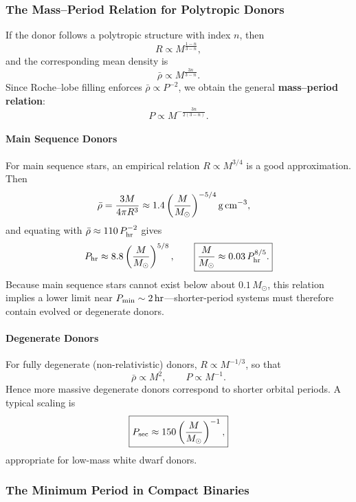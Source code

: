 \subsubsection{The Mass–Period Relation for Polytropic Donors}

If the donor follows a polytropic structure with index $n$, then
\begin{equation}
R \propto M^{\frac{1-n}{3-n}},
\end{equation}
and the corresponding mean density is
\begin{equation}
\bar{\rho} \propto M^{\tfrac{3n}{3-n}}.
\end{equation}
Since Roche–lobe filling enforces $\bar{\rho} \propto P^{-2}$, we obtain the general
\textbf{mass–period relation}:
\[
\boxed{
P \propto M^{-\tfrac{3n}{2(3-n)}}.
}
\]

\paragraph{Main Sequence Donors}
For main sequence stars, an empirical relation $R \propto M^{3/4}$ is a good approximation.  
Then
\begin{align}
\bar{\rho}
   &= \frac{3M}{4\pi R^3}
   \approx 1.4
   \left(\frac{M}{M_\odot}\right)^{-5/4}
   {\rm g\,cm^{-3}},
\end{align}
and equating with $\bar{\rho} \approx 110\,P_{\rm hr}^{-2}$ gives
\[
P_{\rm hr} \approx 8.8
\left(\frac{M}{M_\odot}\right)^{5/8},
\qquad
\boxed{
\frac{M}{M_\odot} \approx 0.03\,P_{\rm hr}^{8/5}.
}
\]
Because main sequence stars cannot exist below about $0.1\,M_\odot$, this relation implies a lower limit near 
$P_{\rm min} \sim 2\,{\rm hr}$—shorter-period systems must therefore contain evolved or degenerate donors.

\paragraph{Degenerate Donors}
For fully degenerate (non-relativistic) donors, $R \propto M^{-1/3}$, so that
\[
\bar{\rho} \propto M^{2},
\qquad
P \propto M^{-1}.
\]
Hence more massive degenerate donors correspond to shorter orbital periods.  
A typical scaling is
\[
\boxed{
P_{\rm sec} \approx 150
\left(\frac{M}{M_\odot}\right)^{-1},
}
\]
appropriate for low-mass white dwarf donors.

\subsubsection{The Minimum Period in Compact Binaries}

